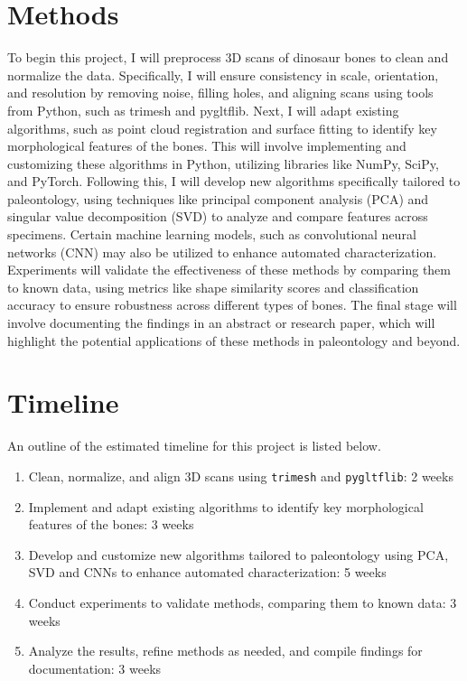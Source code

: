 \documentclass[12pt]{article}
\begin{document}
\section{Methods}
To begin this project, I will preprocess 3D scans of dinosaur bones to clean and
normalize the data. Specifically, I will ensure consistency in scale, orientation, and resolution
by removing noise, filling holes, and aligning scans using tools from Python,
such as trimesh and pygltflib. Next, I will adapt existing algorithms, such as
point cloud registration and surface fitting to identify key morphological
features of the bones. This will involve implementing and customizing these
algorithms in Python, utilizing libraries like NumPy, SciPy, and PyTorch.
Following this, I will develop new algorithms specifically tailored to
paleontology, using techniques like principal component analysis (PCA) and
singular value decomposition (SVD) to analyze and compare features across specimens.
Certain machine learning models, such as convolutional neural networks (CNN) may also
be utilized to enhance automated characterization. Experiments will validate the
effectiveness of these methods by comparing them to known data, using metrics
like shape similarity scores and classification accuracy to ensure robustness
across different types of bones. The final stage will involve documenting the
findings in an abstract or research paper, which will highlight the
potential applications of these methods in paleontology and beyond.

\section{Timeline}
An outline of the estimated timeline for this project is listed below.

\begin{enumerate}
	\item Clean, normalize, and align 3D scans using \texttt{trimesh} and
	\texttt{pygltflib}: 2 weeks
	\item Implement and adapt existing algorithms to identify key morphological
	features of the bones: 3 weeks
	\item Develop and customize new algorithms tailored to paleontology using
	PCA, SVD and CNNs to enhance automated characterization: 5 weeks
	\item Conduct experiments to validate methods, comparing them to known data:
	3 weeks
	\item Analyze the results, refine methods as needed, and compile findings
	for documentation: 3 weeks
\end{enumerate}
\end{document}
